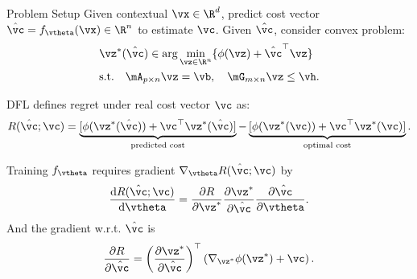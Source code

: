\documentclass[10pt,aspectratio=169,xcolor=dvipsnames]{beamer}
\begin{document}
\begin{frame}{Problem Setup}
    Given contextual $\vx \in \R^d$, predict cost vector $\hat{\vc} = f_\vtheta(\vx) \in \R^n$ to estimate $\vc$. Given $\hat{\vc}$, consider convex problem:
    \begin{equation}
        \begin{aligned}
            & \vz^*(\hat{\vc})  \in \arg\min_{\vz \in \R^n} \{ \phi(\vz) + \hat{\vc}^\top \vz \}\\
            & \text{s.t.}\quad \mA_{p \times n} \vz = \vb ,\quad
             \mG_{m \times n} \vz \leq \vh.
        \end{aligned}
    \end{equation}

    DFL defines regret under real cost vector $\vc$ as:
    \begin{equation}
        R(\hat{\vc}; \vc) = \underbrace{[\phi(\vz^*(\hat{\vc})) + \vc^\top \vz^*(\hat{\vc})]}_{\text{predicted cost}} - \underbrace{[\phi(\vz^*(\vc)) + \vc^\top \vz^*(\vc)]}_{\text{optimal cost}}.
    \end{equation}

    Training $f_\vtheta$ requires gradient $\nabla_\vtheta R(\hat{\vc}; \vc)$ by
    \begin{equation}
        \frac{\mathrm{d} R(\hat{\vc}; \vc)}{\mathrm{d} \vtheta} = \frac{\partial R}{\partial \vz^*} \frac{\partial \vz^*}{\partial \hat{\vc}} \frac{\partial \hat{\vc}}{\partial \vtheta}.
    \end{equation}
    And the gradient w.r.t. $\hat{\vc}$ is
    \begin{equation}
        \frac{\partial R}{\partial \hat{\vc}} = \left( \frac{\partial \vz^*}{\partial \hat{\vc}} \right)^\top \left( \nabla_{\vz^*} \phi(\vz^*) + \vc \right).
    \end{equation}


\end{frame}
\end{document}

